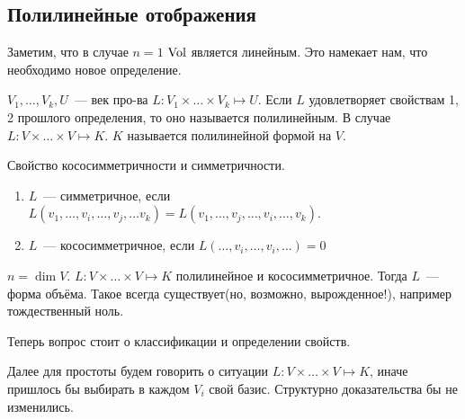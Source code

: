 \subsection{ Полилинейные отображения }
\begin{remark}
    Заметим, что в случае $n = 1$ $\operatorname{Vol}$ является линейным. Это намекает нам, что необходимо
    новое определение.
\end{remark}
\begin{definition}
    $V_1,\dots, V_k, U$~--- век про-ва $L: V_1\times\dots\times V_k\mapsto U$.
    Если $L$ удовлетворяет свойствам 1, 2 прошлого определения, то оно называется полилинейным.
    В случае $L: V\times\dots\times V\mapsto K$. $K$ называется полилинейной формой на $V$.
\end{definition}
\begin{definition}
    Свойство кососимметричности и симметричности.
     \begin{enumerate}
         \item $L$~--- симметричное, если $L(v_1,\dots, v_i, \dots, v_j, \dots v_k) = L(v_1,\dots, v_j,\dots, v_i,\dots, v_k)$.
         \item $L$~--- кососимметричное, если $L(\dots, v_i, \dots, v_i, \dots) = 0$
    \end{enumerate}
\end{definition}
\begin{definition}
    $n = \dim V$. $L: V\times\dots\times V \mapsto K$ полилинейное и кососимметричное.
    Тогда $L$~--- форма объёма. Такое всегда существует(но, возможно, вырожденное!), например тождественный ноль.
\end{definition}
\begin{motivation}
    Теперь вопрос стоит о классификации и определении свойств.
\end{motivation}
Далее для простоты будем говорить о ситуации $L: V\times\dots\times V\mapsto K$, иначе
пришлось бы выбирать в каждом $V_i$ свой базис. Структурно доказательства бы не изменились.

